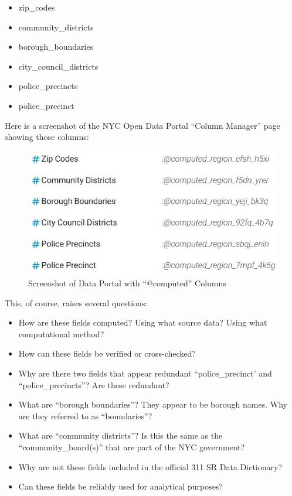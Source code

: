 \documentclass[12pt, titlepage]{article}
\begin{document}
\begin{itemize}
	\item zip\_codes
	\item community\_districts
	\item borough\_boundaries
	\item city\_council\_districts
	\item police\_precincts
	\item police\_precinct 
\end{itemize}	

Here is a screenshot of the NYC Open Data Portal ``Column Manager'' 
page showing those columns:

\begin{figure}[tbp]
 	\centering
 	\includegraphics[width = .65\textwidth] {computed_fields_jpg.jpg}	
	\caption{Screenshot of Data Portal with ``@computed'' Columns}  
	\label{fig:computed-columns}
\end{figure}

This, of course, raises several questions:

\begin{itemize}
	\item How are these fields computed? Using what source data? 
	Using what computational method?
	\item How can these fields be verified or cross-checked?
	\item Why are there two fields that appear redundant ``police\_precinct' 
	and ``police\_precincts''? Are these redundant?
	\item What are ``borough boundaries''? They appear to be borough names. 
	Why are they referred to as ``boundaries''?
	\item What are ``community districts''? Is this the same as the
	 ``community\_board(s)'' that are part of the NYC government?
	\item Why are not these fields included in the official 311 SR Data Dictionary?
	\item Can these fields be reliably used for analytical purposes? 
\end{itemize}	
\end{document}
